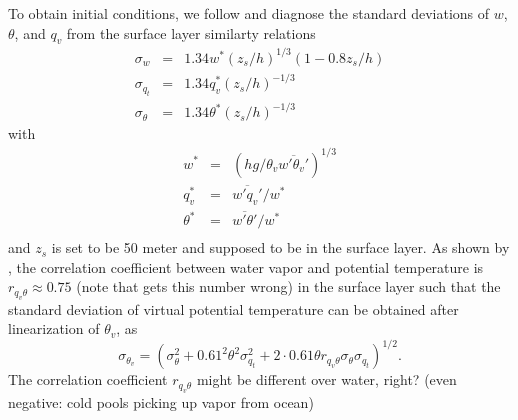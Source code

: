 \documentclass[dvipdfmx,a4paper,10pt]{article}
\begin{document}
% 
% 
% 

To obtain initial conditions, we follow \cite{lenschow80} and diagnose the standard deviations of $w$, $\theta$, and $q_v$ from the surface layer similarty relations
\begin{eqnarray}
 \sigma_w&=&1.34 w^*(z_s/h)^{1/3} (1-0.8z_s/h)\\
   \sigma_{q_t}&=&1.34 q_v^* (z_s/h)^{-1/3}\\
  \sigma_{\theta}&=&1.34\theta^* (z_s/h)^{-1/3}
\end{eqnarray}
with 
\begin{eqnarray}
  w^*&=&(hg/\theta_v \overline{w'\theta_v'})^{1/3}\\
  q_v^*&=&\overline{w'q_v'}/w^*\\
  \theta^*&=&\overline{w'\theta'}/w^*\\
\end{eqnarray}
and $z_s$ is set to be 50 meter and supposed to be in the surface layer. As shown by \cite[][see their Fig.~12]{sorbjan91}, the correlation coefficient between water vapor and potential temperature is $r_{q_v\theta}\approx 0.75$ {\color{blue}(note that \cite{cheinet03a} gets this number wrong)} in the surface layer such that the standard deviation of virtual potential temperature can be obtained after linearization of $\theta_v$, as  
\begin{equation}
 \sigma_{\theta_v}= (\sigma_{\theta}^2 + 0.61^2 \theta^2\sigma_{q_t}^2+2\cdot 0.61\theta r_{q_v\theta} \sigma_{\theta} \sigma_{q_t} )^{1/2}.
\end{equation}
{\color{blue}The correlation coefficient $r_{q_v\theta}$ might be different over water, right? (even negative: cold pools picking up vapor from ocean)}
\end{document}
